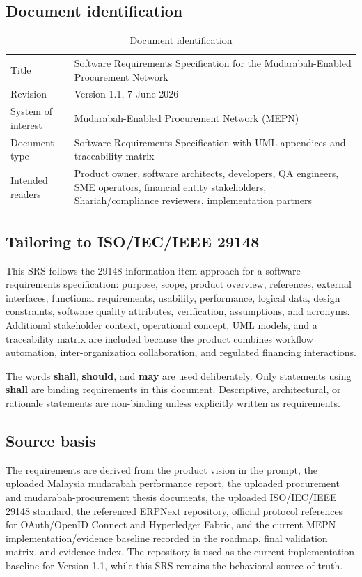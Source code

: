 \documentclass[11pt,a4paper]{article}
\newcommand{\systemname}{Mudarabah-Enabled Procurement Network}
\newcommand{\systemshort}{MEPN}
\newcommand{\must}{\textbf{shall}}
\newcommand{\shouldword}{\textbf{should}}
\newcommand{\mayword}{\textbf{may}}
\begin{document}
\subsection{Document identification}
\begin{table}[h]
\centering
\begin{tabularx}{\textwidth}{@{}lX@{}}
\toprule
Title & Software Requirements Specification for the Mudarabah-Enabled Procurement Network \\
Revision & Version 1.1, 7 June 2026 \\
System of interest & \systemname{} (\systemshort{}) \\
Document type & Software Requirements Specification with UML appendices and traceability matrix \\
Intended readers & Product owner, software architects, developers, QA engineers, SME operators, financial entity stakeholders, Shariah/compliance reviewers, implementation partners \\
\bottomrule
\end{tabularx}
\caption{Document identification}
\end{table}

\subsection{Tailoring to ISO/IEC/IEEE 29148}
This SRS follows the 29148 information-item approach for a software requirements specification: purpose, scope, product overview, references, external interfaces, functional requirements, usability, performance, logical data, design constraints, software quality attributes, verification, assumptions, and acronyms. Additional stakeholder context, operational concept, UML models, and a traceability matrix are included because the product combines workflow automation, inter-organization collaboration, and regulated financing interactions.

The words \must{}, \shouldword{}, and \mayword{} are used deliberately. Only statements using \must{} are binding requirements in this document. Descriptive, architectural, or rationale statements are non-binding unless explicitly written as requirements.

\subsection{Source basis}
The requirements are derived from the product vision in the prompt, the uploaded Malaysia mudarabah performance report, the uploaded procurement and mudarabah-procurement thesis documents, the uploaded ISO/IEC/IEEE 29148 standard, the referenced ERPNext repository, official protocol references for OAuth/OpenID Connect and Hyperledger Fabric, and the current MEPN implementation/evidence baseline recorded in the roadmap, final validation matrix, and evidence index. The repository is used as the current implementation baseline for Version 1.1, while this SRS remains the behavioral source of truth.
\end{document}
